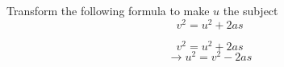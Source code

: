 \question Transform the following formula to make $u$ the subject
\[
	v^{2} = u^{2} + 2as
\]
\begin{solution}
	\[
		v^{2} = u^{2} + 2as
	\]
	\[
		\rightarrow
		u^{2} = v^{2} - 2as
	\]
\end{solution}

